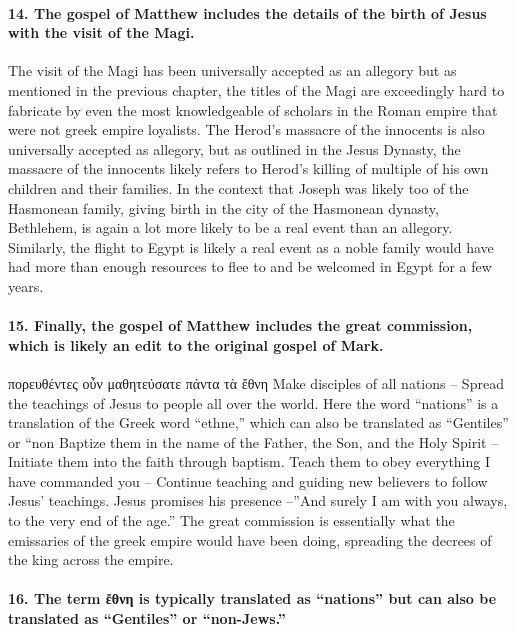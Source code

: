\paragraph{14.
The gospel of Matthew includes the details of the birth of Jesus with the visit of the Magi.}\label{par:the-gospel-of-matthew-includes-the-details-of-the-birth-of-jesus-with-the-visit-of-the-magi.}

The visit of the Magi has been universally accepted as an allegory but as mentioned in the previous chapter, the titles of the Magi are exceedingly hard to fabricate by even the most knowledgeable of scholars in the Roman empire that were not greek empire loyalists.
The Herod's massacre of the innocents is also universally accepted as allegory, but as outlined in the Jesus Dynasty, the massacre of the innocents likely refers to Herod's killing of multiple of his own children and their families.
In the context that Joseph was likely too of the Hasmonean family, giving birth in the city of the Hasmonean dynasty, Bethlehem, is again a lot more likely to be a real event than an allegory.
Similarly, the flight to Egypt is likely a real event as a noble family would have had more than enough resources to flee to and be welcomed in Egypt for a few years.

\paragraph{15.
Finally, the gospel of Matthew includes the great commission, which is likely an edit to the original gospel of Mark.}\label{par:finally-the-gospel-of-matthew-includes-the-great-commission-which-is-likely-an-edit-to-the-original-gospel-of-mark.}

πορευθέντες οὖν μαθητεύσατε πάντα τὰ ἔθνη Make disciples of all nations -- Spread the teachings of Jesus to people all over the world.
Here the word ``nations'' is a translation of the Greek word ``ethne,'' which can also be translated as ``Gentiles'' or ``non Baptize them in the name of the Father, the Son, and the Holy Spirit -- Initiate them into the faith through baptism.
Teach them to obey everything I have commanded you -- Continue teaching and guiding new believers to follow Jesus' teachings.
Jesus promises his presence --''And surely I am with you always, to the very end of the age.'' The great commission is essentially what the emissaries of the greek empire would have been doing, spreading the decrees of the king across the empire.

\paragraph{16.
The term ἔθνη is typically translated as ``nations'' but can also be translated as ``Gentiles'' or ``non-Jews.''}\label{par:the-term-ux1f14ux3b8ux3bdux3b7-is-typically-translated-as-nations-but-can-also-be-translated-as-gentiles-or-non-jews.}


